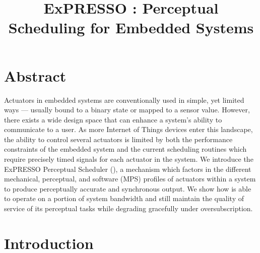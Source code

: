 \documentclass{sigchi}
\newcommand{\expresso}{ExPRESSO }
\newcommand*{\schedule}[1]{{\textbf{\small{\fontfamily{cmss}\selectfont{#1}}}}}
\begin{document}
\title{\expresso: Perceptual Scheduling for Embedded Systems}

\iftoggle{anonymous}{
  \numberofauthors{1}
  \author{
  \alignauthor Anonymous for Submission\\
    \affaddr{...}\\
    \affaddr{...}\\
    \email{...}\\
  }
}{
\numberofauthors{1}
  \author{
  \alignauthor {C\'{e}sar Torres}\\
    \affaddr{Department of Electrical Engineering and Computer Sciences}\\
    \affaddr{University of California Berkeley}\\
    \email{cearto@eecs.berkeley.edu}\\
  }
}
\maketitle
\section{Abstract}
  Actuators in embedded systems are conventionally used in simple, yet limited ways --- usually bound to a binary state or mapped to a sensor value. However, there exists a wide design space that can enhance a system's ability to communicate to a user. As more Internet of Things devices enter this landscape, the ability to control several actuators is limited by both the performance constraints of the embedded system and the current scheduling routines which require precisely timed signals for each actuator in the system. We introduce the \expresso Perceptual Scheduler (\schedule{EPS}), a mechanism which factors in the different mechanical, perceptual, and software (MPS) profiles of actuators within a system to produce perceptually accurate and synchronous output. We show how \schedule{EPS} is able to operate on a portion of system bandwidth and still maintain the quality of service of its perceptual tasks while degrading gracefully under oversubscription. 



\section{Introduction}
\end{document}
